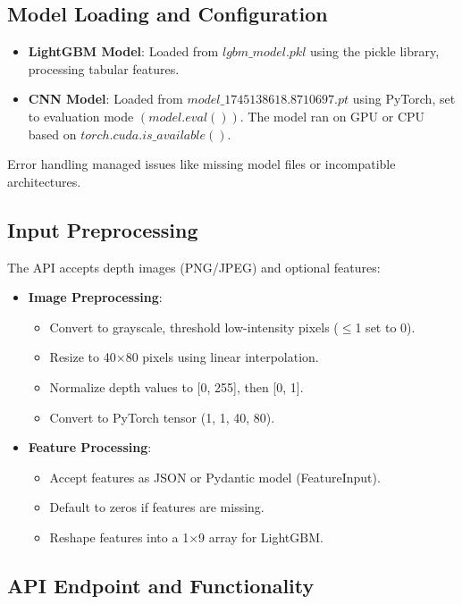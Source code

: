 {\subsection{Model Loading and Configuration}

\begin{itemize}
	\item \textbf{LightGBM Model}: Loaded from $lgbm\_model.pkl$ using the pickle library, processing tabular features.
	\item \textbf{CNN Model}: Loaded from $model\_1745138618.8710697.pt$ using PyTorch, set to evaluation mode $(model.eval())$. The model ran on GPU or CPU based on $torch.cuda.is\_available()$.
\end{itemize}

Error handling managed issues like missing model files or incompatible architectures.

\subsection{Input Preprocessing}

The API accepts depth images (PNG/JPEG) and optional features:

\begin{itemize}
	\item \textbf{Image Preprocessing}:
	\begin{itemize}
		\item Convert to grayscale, threshold low-intensity pixels ($\leq$1 set to 0).
		\item Resize to 40$\times$80 pixels using linear interpolation.
		\item Normalize depth values to [0, 255], then [0, 1].
		\item Convert to PyTorch tensor (1, 1, 40, 80).
	\end{itemize}
	\item \textbf{Feature Processing}:
	\begin{itemize}
		\item Accept features as JSON or Pydantic model (FeatureInput).
		\item Default to zeros if features are missing.
		\item Reshape features into a 1$\times$9 array for LightGBM.	
	\end{itemize}
\end{itemize}

\subsection{API Endpoint and Functionality}

}
